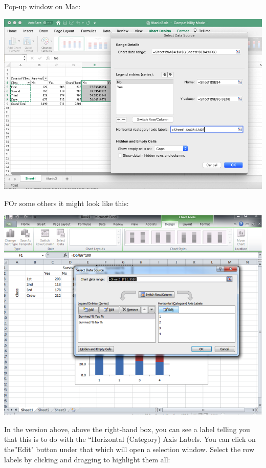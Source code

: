 \documentclass[
]{book}
\begin{document}
Pop-up window on Mac:

\includegraphics{imgs/horizontalcataxislabels.png}

FOr some others it might look like this:

\includegraphics{imgs/stacked_col_4.png}

In the version above, above the right-hand box, you can see a label telling you that this is to do with the ``Horizontal (Category) Axis Labels. You can click on the''Edit" button under that which will open a selection window. Select the row labels by clicking and dragging to highlight them all:
\end{document}
